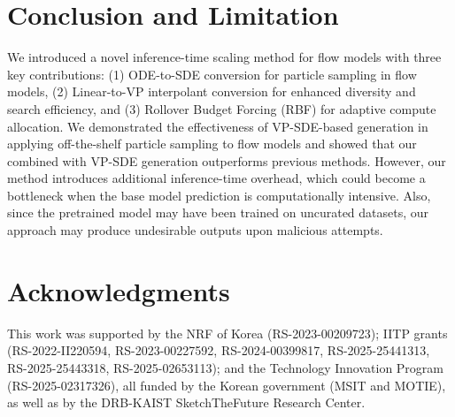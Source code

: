\vspace{-0.7\baselineskip}
\section{Conclusion and Limitation}
\vspace{-0.9\baselineskip}
\label{sec:conclusion}
We introduced a novel inference-time scaling method for flow models with three key contributions: (1) ODE-to-SDE conversion for particle sampling in flow models, (2) Linear-to-VP interpolant conversion for enhanced diversity and search efficiency, and (3) Rollover Budget Forcing (RBF) for adaptive compute allocation. We demonstrated the effectiveness of VP-SDE-based generation in applying off-the-shelf particle sampling to flow models and showed that our \Ours{} combined with VP-SDE generation outperforms previous methods. 
However, our method introduces additional inference-time overhead, which could become a bottleneck when the base model prediction is computationally intensive. Also, since the pretrained model may have been trained on uncurated datasets, our approach may produce undesirable outputs upon malicious attempts. 



\section*{Acknowledgments}
This work was supported by the NRF of Korea (RS-2023-00209723); IITP grants (RS-2022-II220594, RS-2023-00227592, RS-2024-00399817, RS-2025-25441313, RS-2025-25443318, RS-2025-02653113); and the Technology Innovation Program (RS-2025-02317326), all funded by the Korean government (MSIT and MOTIE), as well as by the DRB-KAIST SketchTheFuture Research Center.
